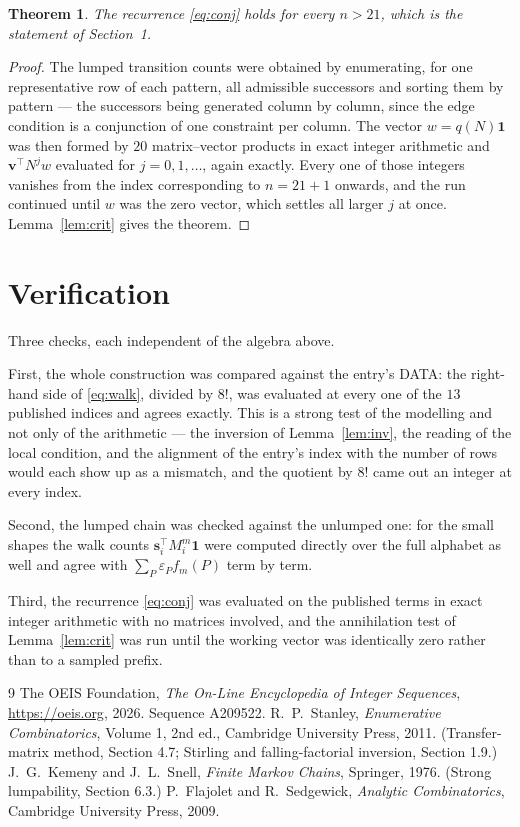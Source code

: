\documentclass[11pt,a4paper]{article}
\theoremstyle{plain}
\newtheorem{theorem}{Theorem}
\theoremstyle{definition}
\begin{document}
\begin{theorem}
The recurrence \eqref{eq:conj} holds for every $n>21$, which is the statement of
Section~1.
\end{theorem}

\begin{proof}
The lumped transition counts were obtained by enumerating, for one representative row of
each pattern, all admissible successors and sorting them by pattern --- the successors being
generated column by column, since the edge condition is a conjunction of one constraint per
column. The vector $w=q(N)\mathbf{1}$ was then formed by $20$ matrix--vector products
in exact integer arithmetic and $\mathbf{v}^{\!\top}N^{j}w$ evaluated for
$j=0,1,\dots$, again exactly. Every one of those integers vanishes from the index
corresponding to $n=21+1$ onwards, and the run continued until $w$ was the zero vector,
which settles all larger $j$ at once. Lemma~\ref{lem:crit} gives the theorem.
\end{proof}

\section{Verification}

Three checks, each independent of the algebra above.

First, the whole construction was compared against the entry's DATA: the right-hand side of
\eqref{eq:walk}, divided by $8!$, was evaluated at every one of the $13$
published indices and agrees exactly. This is a strong test of the modelling and not only of
the arithmetic --- the inversion of Lemma~\ref{lem:inv}, the reading of the local
condition, and the alignment of the entry's index with the number of rows would each
show up as a mismatch, and the quotient by $8!$ came out an integer at every index.

Second, the lumped chain was checked against the unlumped one: for the small shapes the walk
counts $\mathbf{s}_i^{\!\top}M_i^{m}\mathbf{1}$ were computed directly over the full
alphabet as well and agree with $\sum_P\varepsilon_Pf_m(P)$ term by term.

Third, the recurrence \eqref{eq:conj} was evaluated on the published terms in exact integer
arithmetic with no matrices involved, and the annihilation test of Lemma~\ref{lem:crit} was
run until the working vector was identically zero rather than to a sampled prefix.

\begin{thebibliography}{9}
 The OEIS Foundation, \emph{The On-Line Encyclopedia of Integer
Sequences}, \url{https://oeis.org}, 2026. Sequence A209522.
 R.~P.~Stanley, \emph{Enumerative Combinatorics}, Volume 1, 2nd ed.,
Cambridge University Press, 2011. (Transfer-matrix method, Section 4.7; Stirling and
falling-factorial inversion, Section 1.9.)
 J.~G.~Kemeny and J.~L.~Snell, \emph{Finite Markov Chains}, Springer,
1976. (Strong lumpability, Section 6.3.)
 P.~Flajolet and R.~Sedgewick, \emph{Analytic Combinatorics}, Cambridge
University Press, 2009.
\end{thebibliography}
\end{document}
